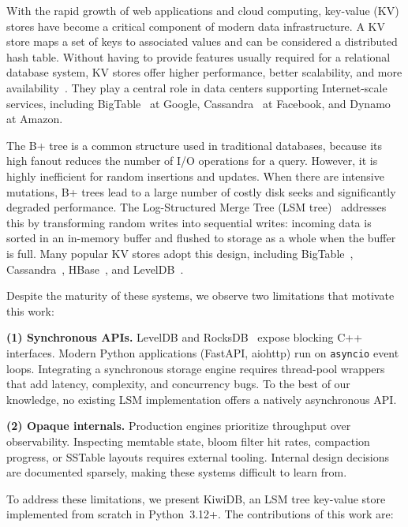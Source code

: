 \documentclass[conference]{IEEEtran}
\begin{document}
With the rapid growth of web applications and cloud computing, key-value (KV) stores have become a critical component of modern data infrastructure. A KV store maps a set of keys to associated values and can be considered a distributed hash table. Without having to provide features usually required for a relational database system, KV stores offer higher performance, better scalability, and more availability~\cite{leavitt2010}. They play a central role in data centers supporting Internet-scale services, including BigTable~\cite{chang2008} at Google, Cassandra~\cite{cassandra} at Facebook, and Dynamo~\cite{decandia2007} at Amazon.

The B+ tree is a common structure used in traditional databases, because its high fanout reduces the number of I/O operations for a query. However, it is highly inefficient for random insertions and updates. When there are intensive mutations, B+ trees lead to a large number of costly disk seeks and significantly degraded performance. The Log-Structured Merge Tree (LSM tree)~\cite{oneil1996} addresses this by transforming random writes into sequential writes: incoming data is sorted in an in-memory buffer and flushed to storage as a whole when the buffer is full. Many popular KV stores adopt this design, including BigTable~\cite{chang2008}, Cassandra~\cite{cassandra}, HBase~\cite{hbase}, and LevelDB~\cite{leveldb}.

Despite the maturity of these systems, we observe two limitations that motivate this work:

\textbf{(1) Synchronous APIs.} LevelDB and RocksDB~\cite{rocksdb} expose blocking C++ interfaces. Modern Python applications (FastAPI, aiohttp) run on \texttt{asyncio} event loops. Integrating a synchronous storage engine requires thread-pool wrappers that add latency, complexity, and concurrency bugs. To the best of our knowledge, no existing LSM implementation offers a natively asynchronous API.

\textbf{(2) Opaque internals.} Production engines prioritize throughput over observability. Inspecting memtable state, bloom filter hit rates, compaction progress, or SSTable layouts requires external tooling. Internal design decisions are documented sparsely, making these systems difficult to learn from.

To address these limitations, we present KiwiDB, an LSM tree key-value store implemented from scratch in Python~3.12+. The contributions of this work are:
\end{document}
